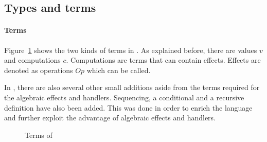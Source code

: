 \subsection{Types and terms}

\paragraph{Terms}
Figure~\ref{fig:terms:eff} shows the two kinds of terms in \eff. As explained before, there are values $v$ and computations $c$. Computations are terms that can contain effects. Effects are denoted as operations $Op$ which can be called. \cite{handling}

In \eff, there are also several other small additions aside from the terms required for the algebraic effects and handlers. Sequencing, a conditional and a recursive definition have also been added. This was done in order to enrich the language and further exploit the advantage of algebraic effects and handlers. \cite{programming}

\begin{figure}[!htb]
\begin{center}
\end{center}
\caption{Terms of \eff}\label{fig:terms:eff}
\end{figure}

